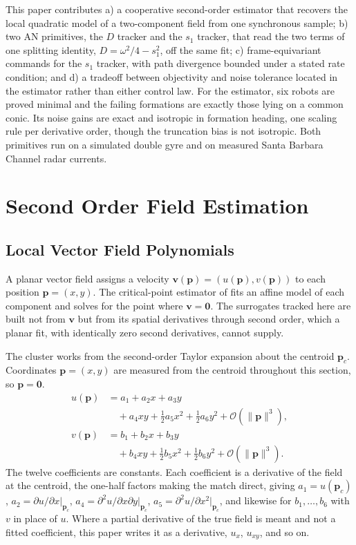 \documentclass[lettersize,journal]{IEEEtran}
\begin{document}
This paper contributes a) a cooperative second-order estimator that
recovers the local quadratic model of a two-component field from one
synchronous sample; b) two AN primitives, the $D$ tracker and the $s_1$
tracker, that read the two terms of one splitting identity, $D =
\omega^2/4 - s_1^2$, off the same fit; c) frame-equivariant commands
for the $s_1$ tracker, with path divergence bounded under a stated rate
condition; and d) a tradeoff between objectivity and noise tolerance
located in the estimator rather than either control law.
For the estimator, six robots are proved minimal and the failing
formations are exactly those lying on a common conic. Its noise gains
are exact and isotropic in formation heading, one scaling rule per
derivative order, though the truncation bias is not isotropic. Both
primitives run on a simulated double gyre and on measured Santa Barbara
Channel radar currents.


\section{Second Order Field Estimation}

\subsection{Local Vector Field Polynomials}

A planar vector field assigns a velocity $\mathbf{v}(\mathbf{p}) =
(u(\mathbf{p}), v(\mathbf{p}))$ to each position $\mathbf{p} = (x, y)$.
The critical-point estimator of \cite{8} fits an affine model of each
component and solves for the point where $\mathbf{v} = \mathbf{0}$. The
surrogates tracked here are built not from $\mathbf{v}$ but from its
spatial derivatives through second order, which a planar fit, with
identically zero second derivatives, cannot supply.

The cluster works from the second-order Taylor expansion about the
centroid $\mathbf{p}_c$. Coordinates $\mathbf{p} = (x, y)$ are measured
from the centroid throughout this section, so $\mathbf{p} = \mathbf{0}$.
\begin{align}
    u(\mathbf{p}) &= a_1 + a_2 x + a_3 y
        \nonumber \\
        &\quad + a_4 xy + \tfrac{1}{2} a_5 x^2 + \tfrac{1}{2} a_6 y^2
        + \mathcal{O}(\|\mathbf{p}\|^3),
        \label{eq:quad_model_u} \\
    v(\mathbf{p}) &= b_1 + b_2 x + b_3 y
        \nonumber \\
        &\quad + b_4 xy + \tfrac{1}{2} b_5 x^2 + \tfrac{1}{2} b_6 y^2
        + \mathcal{O}(\|\mathbf{p}\|^3).
        \label{eq:quad_model_v}
\end{align}
The twelve coefficients are constants. Each coefficient is a derivative of the field at
the centroid, the one-half factors making the match direct,
giving $a_1 = u(\mathbf{p}_c)$, $a_2 = \partial u/\partial
x|_{\mathbf{p}_c}$, $a_4 = \partial^2 u/\partial x \partial
y|_{\mathbf{p}_c}$, $a_5 = \partial^2 u/\partial x^2|_{\mathbf{p}_c}$,
and likewise for $b_1, \ldots, b_6$ with $v$ in place of $u$. Where a
partial derivative of the true field is meant and not a fitted
coefficient, this paper writes it as a derivative, $u_x$, $u_{xy}$, and
so on.
\end{document}

